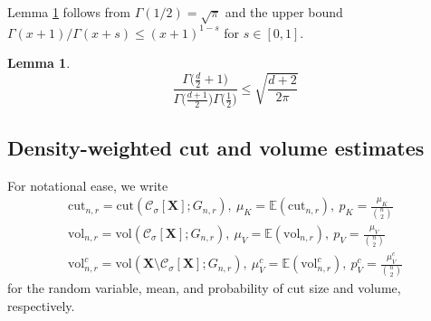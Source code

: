 \documentclass{article}
\newcommand{\vol}{\mathrm{vol}}
\newcommand{\1}{\mathbf{1}}
\newcommand{\cut}{\mathrm{cut}}
\newcommand{\Xbf}{\mathbf{X}}
\newcommand{\Cset}{\mathcal{C}}
\newcommand{\Csig}{\Cset_{\sigma}}
\theoremstyle{aldenthm}
\newtheorem{lemma}{Lemma}
\begin{document}
Lemma \ref{lem: beta_function} follows from $\Gamma(1/2) = \sqrt{\pi}$ and the upper bound $\Gamma(x + 1)/ \Gamma(x+s) \leq (x + 1)^{1-s}$ for $s \in [0,1]$.
\begin{lemma}
	\label{lem: beta_function}
	\begin{equation*}
	\frac{\Gamma\bigl(\frac{d}{2}+ 1\bigr)}{\Gamma\bigl(\frac{d + 1}{2}\bigr) \Gamma\bigl(\frac{1}{2}\bigr)} \leq \sqrt{\frac{d + 2}{2\pi}}
	\end{equation*}
\end{lemma}

\subsection{Density-weighted cut and volume estimates}
\label{sec: density_weighted_cut_and_volume_estimates}

For notational ease, we write
\begin{align*}
\cut_{n,r} = \cut(\Csig[\Xbf]; G_{n,r}), ~ \mu_K = \mathbb{E}(\cut_{n,r}), ~ p_K = \frac{\mu_K}{{n \choose 2}} \\
\vol_{n,r} = \vol(\Csig[\Xbf]; G_{n,r}), ~ \mu_V = \mathbb{E}(\vol_{n,r}), ~ p_V = \frac{\mu_V}{{n \choose 2}} \\
\vol_{n,r}^c = \vol(\Xbf \setminus \Csig[\Xbf]; G_{n,r}), ~ \mu_V^c = \mathbb{E}(\vol_{n,r}^c), ~ p_V^c = \frac{\mu_V^c}{{n \choose 2}}
\end{align*}
for the random variable, mean, and probability of cut size and volume, respectively. 
\end{document}
